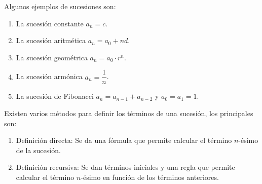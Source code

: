 \begin{frame}
  \begin{egs}
    Algunos ejemplos de sucesiones son:\\[0.5cm]
    \begin{enumerate}[<+->]
      \item La sucesión constante $a_n=c$.\\[0.25cm]
      \item La sucesión aritmética $a_n=a_0+nd$.\\[0.25cm]
      \item La sucesión geométrica $a_n=a_0\cdot r^n$.\\[0.25cm]
      \item La sucesión armónica $a_n=\dfrac{1}{n}$.\\[0.25cm]
      \item La sucesión de Fibonacci $a_n=a_{n-1}+a_{n-2}$ y $a_0=a_1=1$.\\[0.25cm]
    \end{enumerate}
  \end{egs}
\end{frame}

\begin{frame}
  Existen varios métodos para definir los términos de una sucesión, los principales son:\\[0.5cm]
  \begin{enumerate}
    \item<2-> Definición directa: Se da una fórmula que permite calcular el término $n$-ésimo de la sucesión.\\[0.25cm]
    \item<3-> Definición recursiva: Se dan términos iniciales y una regla que permite calcular el término $n$-ésimo en función de los términos anteriores.\\[0.25cm]
  \end{enumerate}
\end{frame}


